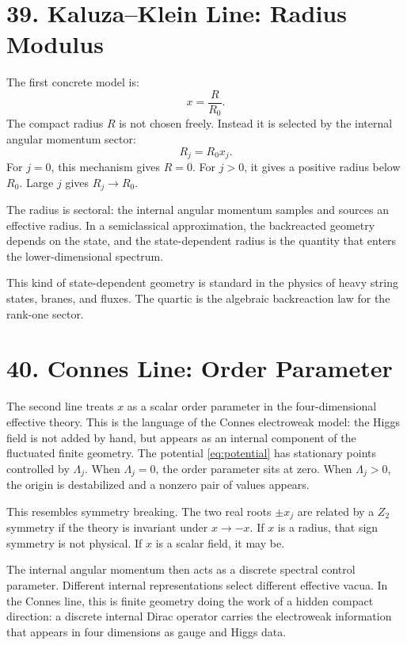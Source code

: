 \documentclass[11pt]{article}
\newcommand{\Lspin}{\Lambda_j}
\begin{document}
\section*{39. Kaluza--Klein Line: Radius Modulus}

The first concrete model is:
\[
        x=\frac{R}{R_0}.
\]
The compact radius \(R\) is not chosen freely. Instead it is selected by the internal angular momentum sector:
\[
        R_j=R_0x_j .
\]
For \(j=0\), this mechanism gives \(R=0\). For \(j>0\), it gives a positive radius below \(R_0\). Large \(j\) gives \(R_j\to R_0\).

The radius is sectoral: the internal angular momentum samples and sources an effective radius. In a semiclassical approximation, the backreacted geometry depends on the state, and the state-dependent radius is the quantity that enters the lower-dimensional spectrum.

This kind of state-dependent geometry is standard in the physics of heavy string states, branes, and fluxes. The quartic is the algebraic backreaction law for the rank-one sector.


\section*{40. Connes Line: Order Parameter}

The second line treats \(x\) as a scalar order parameter in the four-dimensional effective theory. This is the language of the Connes electroweak model: the Higgs field is not added by hand, but appears as an internal component of the fluctuated finite geometry. The potential \eqref{eq:potential} has stationary points controlled by \(\Lspin\). When \(\Lspin=0\), the order parameter sits at zero. When \(\Lspin>0\), the origin is destabilized and a nonzero pair of values appears.

This resembles symmetry breaking. The two real roots \(\pm x_j\) are related by a \(Z_2\) symmetry if the theory is invariant under \(x\to -x\). If \(x\) is a radius, that sign symmetry is not physical. If \(x\) is a scalar field, it may be.

The internal angular momentum then acts as a discrete spectral control parameter. Different internal representations select different effective vacua. In the Connes line, this is finite geometry doing the work of a hidden compact direction: a discrete internal Dirac operator carries the electroweak information that appears in four dimensions as gauge and Higgs data.
\end{document}
